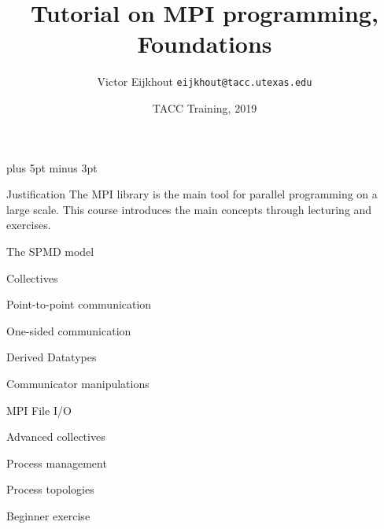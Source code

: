 \documentclass[11pt,headernav]{beamer}
\def\Location{TACC Training, 2019}
\def\TitleExtra{, Foundations}
\newcounter{tacc}
\begin{document}
\parskip=10pt plus 5pt minus 3pt

\title{Tutorial on MPI programming\TitleExtra}
\author{Victor Eijkhout {\tt eijkhout@tacc.utexas.edu}}
\date{\Location}

\begin{frame}
  \titlepage
\end{frame}

  \begin{frame}{Justification}
    The MPI library is the main tool
    for parallel programming on a large scale.
    This course introduces the main concepts
    through lecturing and exercises.
  \end{frame}

   {The SPMD model}
  

   {Collectives}
  

   {Point-to-point communication}
  

   {One-sided communication}
   

   {Derived Datatypes}
  

   {Communicator manipulations}
  

   {MPI File I/O}
  

   {Advanced collectives}
  

   {Process management}
  

   {Process topologies}
  

   {Beginner exercise}

  \begin{exerciseframe}
    
  \end{exerciseframe}
\end{document}
